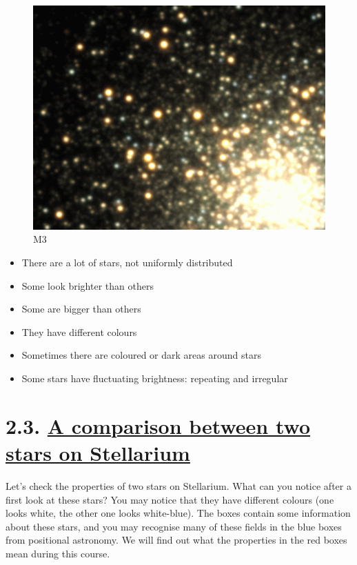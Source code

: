 \documentclass[
  letterpaper,
  DIV=11,
  numbers=noendperiod]{scrreprt}
\providecommand{\tightlist}{%
  \setlength{\itemsep}{0pt}\setlength{\parskip}{0pt}}\usepackage{longtable,booktabs,array}
\begin{document}
\begin{figure}

{\centering \includegraphics{img/M3_color3.gif}

}

\caption{M3}

\end{figure}

\begin{itemize}
\tightlist
\item
  There are a lot of stars, not uniformly distributed
\item
  Some look brighter than others
\item
  Some are bigger than others
\item
  They have different colours
\item
  Sometimes there are coloured or dark areas around stars
\item
  Some stars have fluctuating brightness: repeating and irregular
\end{itemize}

\hypertarget{a-comparison-between-two-stars-on-stellarium}{%
\section{\texorpdfstring{2.3. \protect\hyperlink{toc0_}{A comparison
between two stars on
Stellarium}}{2.3. A comparison between two stars on Stellarium}}\label{a-comparison-between-two-stars-on-stellarium}}

Let's check the properties of two stars on Stellarium. What can you
notice after a first look at these stars? You may notice that they have
different colours (one looks white, the other one looks white-blue). The
boxes contain some information about these stars, and you may recognise
many of these fields in the blue boxes from positional astronomy. We
will find out what the properties in the red boxes mean during this
course.
\end{document}
